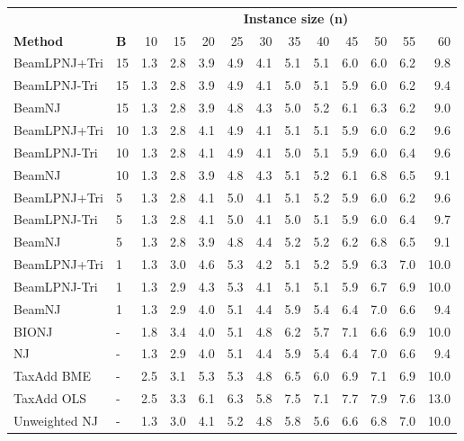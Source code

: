 \begin{tabular}{llrrrrrrrrrrr}
\toprule
&& \multicolumn{11}{c}{\textbf{Instance size (n)}} \\
\cmidrule(lr){3-13}
\textbf{Method} & \textbf{B} & 10 & 15 & 20 & 25 & 30 & 35 & 40 & 45 & 50 & 55 & 60 \\
\midrule
BeamLPNJ+Tri & 15 & 1.3 & 2.8 & 3.9 & 4.9 & 4.1 & 5.1 & 5.1 & 6.0 & 6.0 & 6.2 & 9.8 \\
BeamLPNJ-Tri & 15 & 1.3 & 2.8 & 3.9 & 4.9 & 4.1 & 5.0 & 5.1 & 5.9 & 6.0 & 6.2 & 9.4 \\
BeamNJ & 15 & 1.3 & 2.8 & 3.9 & 4.8 & 4.3 & 5.0 & 5.2 & 6.1 & 6.3 & 6.2 & 9.0 \\
BeamLPNJ+Tri & 10 & 1.3 & 2.8 & 4.1 & 4.9 & 4.1 & 5.1 & 5.1 & 5.9 & 6.0 & 6.2 & 9.6 \\
BeamLPNJ-Tri & 10 & 1.3 & 2.8 & 4.1 & 4.9 & 4.1 & 5.0 & 5.1 & 5.9 & 6.0 & 6.4 & 9.6 \\
BeamNJ & 10 & 1.3 & 2.8 & 3.9 & 4.8 & 4.3 & 5.1 & 5.2 & 6.1 & 6.8 & 6.5 & 9.1 \\
BeamLPNJ+Tri & 5 & 1.3 & 2.8 & 4.1 & 5.0 & 4.1 & 5.1 & 5.2 & 5.9 & 6.0 & 6.2 & 9.6 \\
BeamLPNJ-Tri & 5 & 1.3 & 2.8 & 4.1 & 5.0 & 4.1 & 5.0 & 5.1 & 5.9 & 6.0 & 6.4 & 9.7 \\
BeamNJ & 5 & 1.3 & 2.8 & 3.9 & 4.8 & 4.4 & 5.2 & 5.2 & 6.2 & 6.8 & 6.5 & 9.1 \\
BeamLPNJ+Tri & 1 & 1.3 & 3.0 & 4.6 & 5.3 & 4.2 & 5.1 & 5.2 & 5.9 & 6.3 & 7.0 & 10.0 \\
BeamLPNJ-Tri & 1 & 1.3 & 2.9 & 4.3 & 5.3 & 4.1 & 5.1 & 5.1 & 5.9 & 6.7 & 6.9 & 10.0 \\
BeamNJ & 1 & 1.3 & 2.9 & 4.0 & 5.1 & 4.4 & 5.9 & 5.4 & 6.4 & 7.0 & 6.6 & 9.4 \\
BIONJ & - & 1.8 & 3.4 & 4.0 & 5.1 & 4.8 & 6.2 & 5.7 & 7.1 & 6.6 & 6.9 & 10.0 \\
NJ & - & 1.3 & 2.9 & 4.0 & 5.1 & 4.4 & 5.9 & 5.4 & 6.4 & 7.0 & 6.6 & 9.4 \\
TaxAdd BME & - & 2.5 & 3.1 & 5.3 & 5.3 & 4.8 & 6.5 & 6.0 & 6.9 & 7.1 & 6.9 & 10.0 \\
TaxAdd OLS & - & 2.5 & 3.3 & 6.1 & 6.3 & 5.8 & 7.5 & 7.1 & 7.7 & 7.9 & 7.6 & 13.0 \\
Unweighted NJ & - & 1.3 & 3.0 & 4.1 & 5.2 & 4.8 & 5.8 & 5.6 & 6.6 & 6.8 & 7.0 & 10.0 \\
\bottomrule
\end{tabular}
